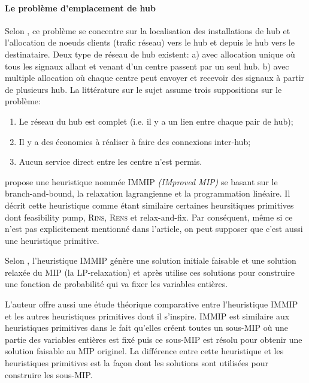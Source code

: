 \documentclass[12pt,a4paper,oneside]{book}
\theoremstyle{definition}
\begin{document}
	    \paragraph{Le problème d'emplacement de hub}
            
            Selon \cite{Alumur2008}, ce problème se concentre sur la localisation des installations de hub et l'allocation de noeuds clients (trafic réseau) vers le hub et depuis le hub vers le destinataire.  Deux type de réseau de hub existent: a) avec allocation unique où tous les signaux allant et venant d'un centre passent par un seul hub. b) avec multiple allocation où chaque centre peut envoyer et recevoir des signaux à partir de plusieurs hub. La littérature sur le sujet assume trois suppositions sur le problème:
            \begin{enumerate}
                \item Le réseau du hub est complet (i.e. il y a un lien entre chaque pair de hub);
                \item Il y a des économies à réaliser à faire des connexions inter-hub;
                \item Aucun service direct entre les centre n'est permis.
            \end{enumerate}
            
            \cite{He2015} propose une heuristique nommée IMMIP \textit{(IMproved MIP)} se basant sur le branch-and-bound, la relaxation lagrangienne et la programmation linéaire. Il décrit cette heuristique comme étant similaire certaines heursitiques primitives dont feasibility pump, \textsc{Rins}, \textsc{Rens} et relax-and-fix. Par conséquent, même si ce n'est pas explicitement mentionné dans l'article, on peut supposer que c'est aussi une heuristique primitive.
          
            Selon \cite{He2015}, l'heuristique IMMIP génère une solution initiale faisable et une solution relaxée du MIP (la LP-relaxation) et après utilise ces solutions pour construire une fonction de probabilité qui va fixer les variables entières.
          
            L'auteur offre aussi une étude théorique comparative entre l'heuristique IMMIP et les autres heuristiques primitives dont il s'inspire. IMMIP est similaire aux heuristiques primitives dans le fait qu'elles créent toutes un sous-MIP où une partie des variables entières est fixé puis ce sous-MIP est résolu pour obtenir une solution faisable au MIP originel. La différence entre cette heuristique et les heuristiques primitives est la façon dont les solutions sont utilisées pour construire les sous-MIP.      
            
\end{document}
